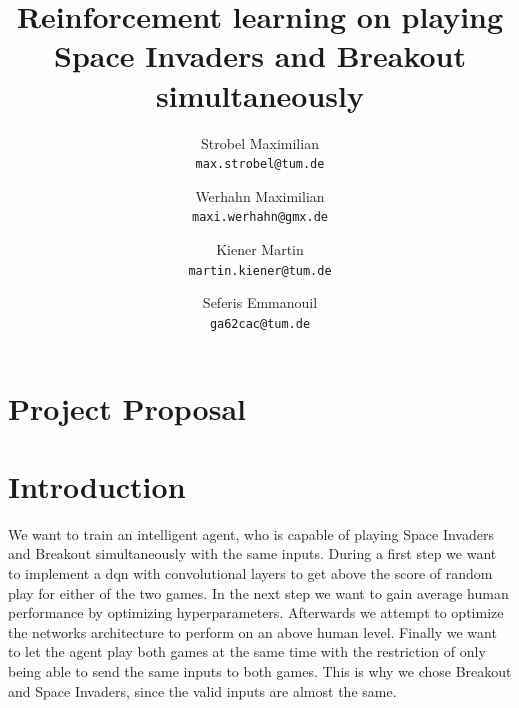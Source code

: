 \documentclass[10pt,twocolumn,letterpaper]{article}
\begin{document}
\title{Reinforcement learning on playing Space Invaders and Breakout simultaneously}

\author{Strobel Maximilian\\
{\tt\small max.strobel@tum.de}
\and
Werhahn Maximilian\\
{\tt\small maxi.werhahn@gmx.de}
\and
Kiener Martin\\
{\tt\small martin.kiener@tum.de}
\and
Seferis Emmanouil \\
{\tt\small ga62cac@tum.de}
}


\maketitle

%
%
\section*{Project Proposal}

\section{Introduction}
We want to train an intelligent agent, who is capable of playing Space Invaders and Breakout simultaneously with the same inputs. During a first step we want to implement a \gls{dqn} with convolutional layers to get above the score of random play for either of the two games. In the next step we want to gain average human performance by optimizing hyperparameters. Afterwards we attempt to optimize the networks architecture to perform on an above human level. Finally we want to let the agent play both games at the same time with the restriction of only being able to send the same inputs to both games. This is why we chose Breakout and Space Invaders, since the valid inputs are almost the same.
\end{document}
